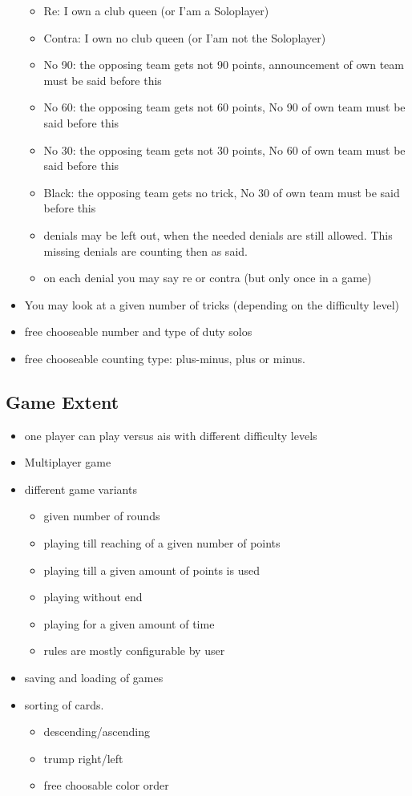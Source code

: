 \documentclass[12pt,a4paper]{article}
\begin{document}
\begin{itemize}
\begin{itemize}
\item Re: I own a club queen (or I'am a Soloplayer)
\item Contra: I own no club queen (or I'am not the Soloplayer)
\item No 90: the opposing team gets not 90 points, announcement of own team must be said before this
\item No 60: the opposing team gets not 60 points, No 90 of own team must be said before this
\item No 30: the opposing team gets not 30 points, No 60 of own team must be said before this
\item Black: the opposing team gets no trick, No 30 of own team must be said before this
\item denials may be left out, when the needed denials are still allowed. This missing denials
are counting then as said.
\item on each denial you may say re or contra (but only once in a game)
\end{itemize}
\item You may look at a given number of tricks (depending on the difficulty level)
\item free chooseable number and type of duty solos
\item free chooseable counting type: plus-minus, plus or minus.
\end{itemize}
\subsection{Game Extent}
\begin{itemize}
\item one player can play versus ais with different difficulty levels
\item Multiplayer game
\item different game variants
\begin{itemize}
\item given number of rounds
\item playing till reaching of a given number of points
\item playing till a given amount of points is used
\item playing without end
\item playing for a given amount of time
\item rules are mostly configurable by user
\end{itemize}
\item saving and loading of games
\item sorting of cards.
\begin{itemize}
\item descending/ascending
\item trump right/left
\item free choosable color order
\end{itemize}
\end{itemize}
\end{document}
